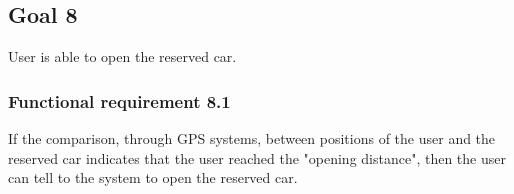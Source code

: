 \subsection{Goal 8}
User is able to open the reserved car.

\setcounter{secnumdepth}{3}
\subsubsection{Functional requirement 8.1}
If the comparison, through GPS systems, between positions of the user and the reserved car indicates that the user reached the "opening distance", then the user can tell to the system to open the reserved car.
